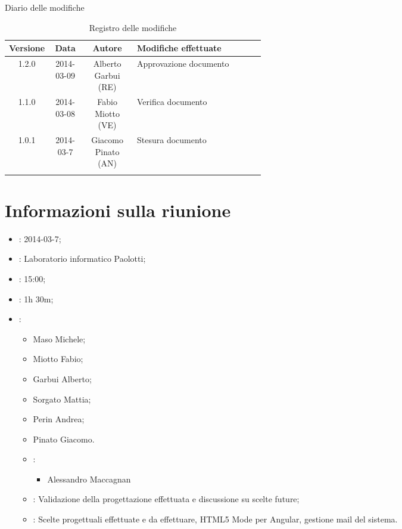 
\newpage
Diario delle modifiche
\begin{center}
\begin{longtable}{|c|c|c|p{0.5\linewidth}|}
\toprule
\textbf{Versione} & \textbf{Data} & \textbf{Autore} & \textbf{Modifiche effettuate}\\

\midrule
1.2.0 & 2014-03-09 & Alberto Garbui (RE)  & Approvazione documento\\
\midrule
1.1.0 & 2014-03-08 & Fabio Miotto (VE) & Verifica documento\\
\midrule
1.0.1 & 2014-03-7 & Giacomo Pinato (AN) & Stesura documento\\

\bottomrule
\caption{Registro delle modifiche}
\label{tab:changelog}
\end{longtable}
\end{center}

\newpage
\tableofcontents


\newpage
\section{Informazioni sulla riunione}%
\label{1.0}
\begin{itemize}
\item {}: 2014-03-7;
\item {}: Laboratorio informatico Paolotti;
\item {}: 15:00;
\item {}: 1h 30m;
\item {}: \NomeGruppo{}
\begin{itemize}
\item Maso Michele;
\item Miotto Fabio;
\item Garbui Alberto;
\item Sorgato Mattia;
\item Perin Andrea;
\item Pinato Giacomo.
\item {}:
\begin{itemize}
\item Alessandro Maccagnan
\end{itemize}
\item {}: Validazione della progettazione effettuata e discussione su scelte future;
\item {}: Scelte progettuali effettuate e da effettuare, HTML5 Mode per Angular, gestione mail del sistema.
\end{itemize}
\end{itemize}

